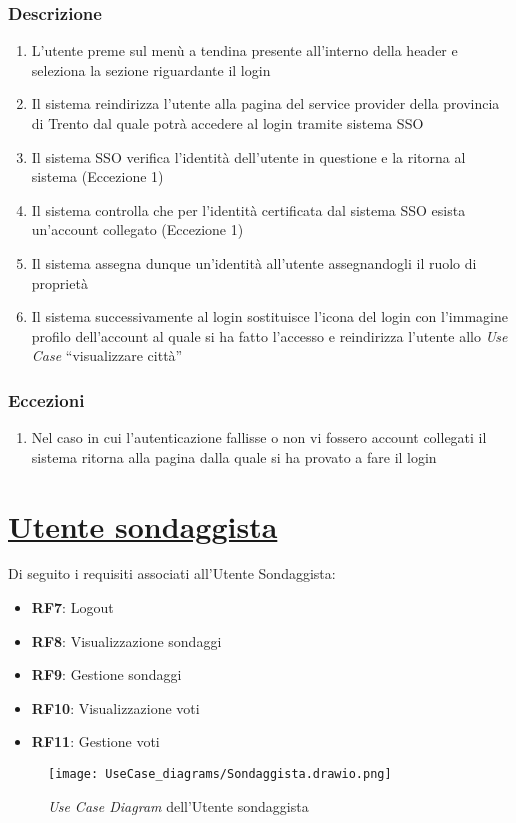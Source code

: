         \subsubsection{Descrizione}
            \begin{enumerate}
                \item L'utente preme sul menù a tendina presente all'interno della header e seleziona la sezione riguardante il login
                \item Il sistema reindirizza l'utente alla pagina del service provider della provincia di Trento dal quale potrà accedere al login tramite sistema SSO
                \item Il sistema SSO verifica l'identità dell'utente in questione e la ritorna al sistema (Eccezione 1)
                \item Il sistema controlla che per l'identità certificata dal sistema SSO esista un'account collegato (Eccezione 1)
                \item Il sistema assegna dunque un'identità all'utente assegnandogli il ruolo di proprietà
                \item Il sistema successivamente al login sostituisce l'icona del login con l'immagine profilo dell'account al quale si ha fatto l'accesso e reindirizza l'utente allo \textit{Use Case} ``visualizzare città''
            \end{enumerate}
        \subsubsection{Eccezioni}
            \begin{enumerate}
                \item Nel caso in cui l'autenticazione fallisse o non vi fossero account collegati il sistema ritorna alla pagina dalla quale si ha provato a fare il login
            \end{enumerate}


\section{\underline{Utente sondaggista}}
    Di seguito i requisiti associati all'Utente Sondaggista:
    \begin{itemize}
        \item \textbf{RF7}: Logout
        \item \textbf{RF8}: Visualizzazione sondaggi
        \item \textbf{RF9}: Gestione sondaggi
        \item \textbf{RF10}: Visualizzazione voti
        \item \textbf{RF11}: Gestione voti
    \end{itemize}
    \begin{figure}[H]
        \centering
        \texttt{[image: UseCase\_diagrams/Sondaggista.drawio.png]}
        \caption{\textit{Use Case Diagram} dell'Utente sondaggista}
    \end{figure}

